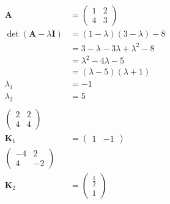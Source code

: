 \documentclass{article}
\begin{document}
\setcounter{subsubsection}{40}
\subsubsection{}

\begin{align*}
  \mathbf{A}                             & = \begin{pmatrix}
                                               1 & 2 \\
                                               4 & 3
                                             \end{pmatrix}                          \\
  \det (\mathbf{A} - \lambda \mathbf{I}) & = (1 - \lambda) (3 - \lambda) - 8         \\
                                         & = 3 - \lambda - 3 \lambda + \lambda^2 - 8 \\
                                         & = \lambda^2 - 4 \lambda - 5               \\
                                         & = (\lambda - 5) (\lambda + 1)             \\
  \lambda_1                              & = -1                                      \\
  \lambda_2                              & = 5                                       \\ \\
  \begin{pmatrix}
    2 & 2 \\
    4 & 4
  \end{pmatrix}                                                                     \\
  \mathbf{K}_1                           & = \begin{pmatrix}
                                               1 & -1
                                             \end{pmatrix}                          \\
  \begin{pmatrix}
    -4 & 2  \\
    4  & -2
  \end{pmatrix}                                                                     \\
  \mathbf{K}_2                           & = \begin{pmatrix}
                                               \frac{1}{2} \\
                                               1
                                             \end{pmatrix}
\end{align*}
\end{document}
